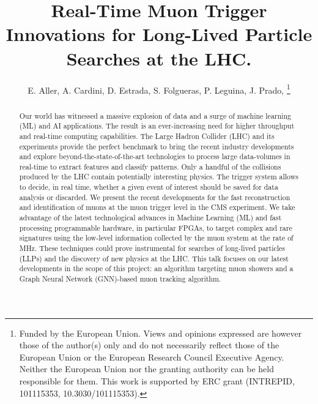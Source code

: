 \documentclass{IEEEtran}
\begin{document}
\title{Real-Time Muon Trigger Innovations for Long-Lived Particle Searches at the LHC.}
\author{E. Aller, A. Cardini, D. Estrada, S. Folgueras, P. Leguina, J. Prado, 
\thanks{Funded by the European Union. Views and opinions expressed are however those of the author(s) only and do not necessarily reflect those of the European Union or the European Research Council Executive Agency. Neither the European Union nor the granting authority can be held responsible for them. This work is supported by ERC grant (INTREPID, 101115353, 10.3030/101115353).}
}

\maketitle

\begin{abstract}
Our world has witnessed a massive explosion of data and a surge of machine learning (ML) and AI applications. The result is an ever-increasing need for higher throughput and real-time computing capabilities. The Large Hadron Collider (LHC) and its experiments provide the perfect benchmark to bring the recent industry developments and explore beyond-the-state-of-the-art technologies to process large data-volumes in real-time to extract features and classify patterns. Only a handful of the collisions produced by the LHC contain potentially interesting physics. The trigger system allows to decide, in real time, whether a given event of interest should be saved for data analysis or discarded. We present the recent developments for the fast reconstruction and identification of muons at the  muon trigger level in the CMS experiment. We take advantage of the latest technological advances in Machine Learning (ML) and fast processing programmable hardware, in particular FPGAs, to target complex and rare signatures using the low-level information collected by the muon system at the rate of MHz. These techniques could prove instrumental for searches of long-lived particles (LLPs) and the discovery of new physics at the LHC. This talk focuses on our latest developments in the scope of this project: an algorithm targeting muon showers and a Graph Neural Network (GNN)-based muon tracking algorithm.
\end{abstract}
\end{document}
